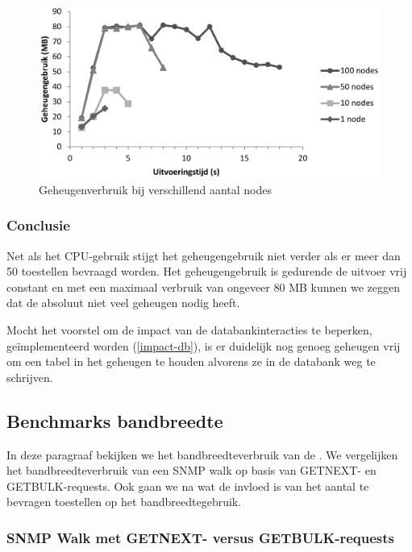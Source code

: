 \begin{figure}[h]
	\centering
	\includegraphics[scale=0.40]{figures/ram-100nodes}
	\caption{Geheugenverbruik bij verschillend aantal nodes}
	\label{fig-ram-aantalnodes}
\end{figure}

\subsubsection{Conclusie}

Net als het CPU-gebruik stijgt het geheugengebruik niet verder als er meer dan 50 toestellen bevraagd worden.
Het geheugengebruik is gedurende de uitvoer vrij constant en met een maximaal verbruik van ongeveer 80 MB kunnen we zeggen dat
de \nwmretriever{} absoluut niet veel geheugen nodig heeft.

Mocht het voorstel om de impact van de databankinteracties te beperken, geïmplementeerd worden (\cref{impact-db}),
is er duidelijk nog genoeg geheugen vrij om een tabel in het geheugen te houden alvorens ze in de databank weg te schrijven. 


\subsection{Benchmarks bandbreedte}
\label{benchmarks-bandbreedte}

In deze paragraaf bekijken we het bandbreedteverbruik van de \nwmretriever{}.
We vergelijken het bandbreedteverbruik van een SNMP walk op basis van GETNEXT- en GETBULK-requests.
Ook gaan we na wat de invloed is van het aantal te bevragen toestellen op het bandbreedtegebruik.

\subsubsection{SNMP Walk met GETNEXT- versus GETBULK-requests}


